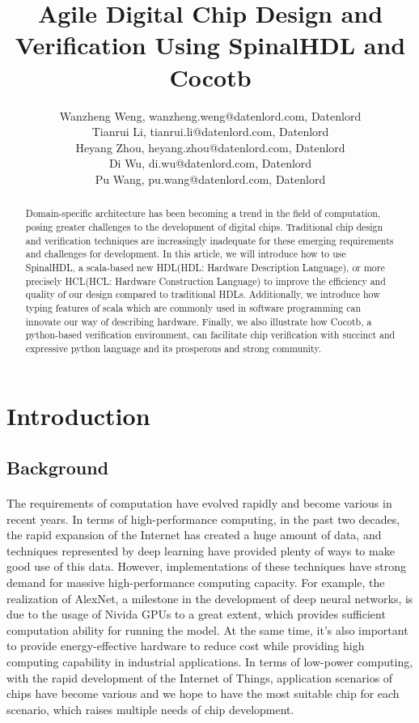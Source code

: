 \documentclass{article}
\title{Agile Digital Chip Design and Verification Using SpinalHDL and Cocotb}
\author{ 
Wanzheng Weng, wanzheng.weng@datenlord.com, Datenlord \\
Tianrui Li, tianrui.li@datenlord.com, Datenlord \\
Heyang Zhou, heyang.zhou@datenlord.com, Datenlord \\
Di Wu, di.wu@datenlord.com, Datenlord \\
Pu Wang, pu.wang@datenlord.com, Datenlord \\
}
\date{}
\begin{document}
\maketitle

\begin{abstract}
Domain-specific architecture has been becoming a trend in the field of computation, posing greater challenges to the development of digital chips. Traditional chip design and verification techniques are increasingly inadequate for these emerging requirements and challenges for development. In this article, we will introduce how to use SpinalHDL, a scala-based new HDL(HDL: Hardware Description Language), or more precisely HCL\cite{6241660}(HCL: Hardware Construction Language) to improve the efficiency and quality of our design compared to traditional HDLs. Additionally, we introduce how typing features of scala which are commonly used in software programming can innovate our way of describing hardware. Finally, we also illustrate how Cocotb, a python-based verification environment, can facilitate chip verification with succinct and expressive python language and its prosperous and strong community.
\end{abstract}

\section{Introduction}
\subsection{Background}
\paragraph{}
The requirements of computation have evolved rapidly and become various in recent years. In terms of high-performance computing, in the past two decades, the rapid expansion of the Internet has created a huge amount of data, and techniques represented by deep learning have provided plenty of ways to make good use of this data. However, implementations of these techniques have strong demand for massive high-performance computing capacity. For example, the realization of AlexNet\cite{NIPS2012_c399862d}, a milestone in the development of deep neural networks, is due to the usage of Nivida GPUs to a great extent, which provides sufficient computation ability for running the model. At the same time, it’s also important to provide energy-effective hardware to reduce cost while providing high computing capability in industrial applications.  In terms of low-power computing, with the rapid development of the Internet of Things, application scenarios of chips have become various and we hope to have the most suitable chip for each scenario, which raises multiple needs of chip development.
\end{document}
